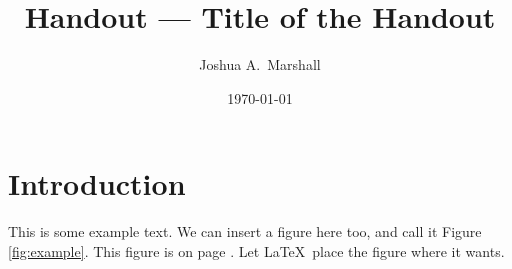 \documentclass[letterpaper,fleqn,oneside]{qu-handout}
\begin{document}
\pagestyle{plain}


\renewcommand{\institution}{Queen's University at Kingston, Canada}
\renewcommand{\coursetitle}{ELEC 443 Linear Control Systems}
\renewcommand{\term}{Fall 2019}


\title{Handout --- Title of the Handout}
\author{Joshua A.~Marshall}
\date{\today}


\thispagestyle{title}

\begin{bshaded}
  \begin{center}
    \Large\bf\thetitle
  \end{center}
\end{bshaded}


\tableofcontents


\section{Introduction}

This is some example text.  We can insert a figure here too, and call it Figure \ref{fig:example}.  This figure is on page \pageref{fig:example}.  Let \LaTeX\ place the figure where it wants.  
\end{document}
